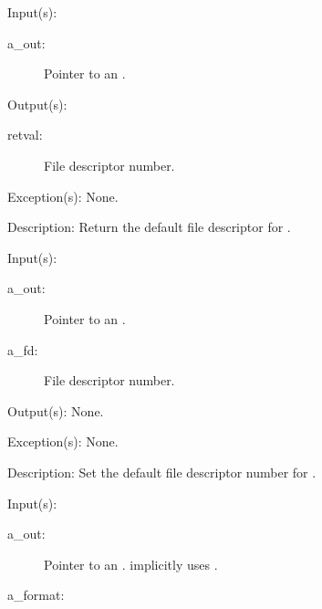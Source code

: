 \begin{capi}
	\begin{capilist}
	\item[Input(s): ]
		\begin{description}\item[]
		\item[a\_out: ]
			Pointer to an .
		\end{description}
	\item[Output(s): ]
		\begin{description}\item[]
		\item[retval: ]
			File descriptor number.
		\end{description}
	\item[Exception(s): ] None.
	\item[Description: ]
		Return the default file descriptor for .
	\end{capilist}
\label{out_default_fd_set}
	\begin{capilist}
	\item[Input(s): ]
		\begin{description}\item[]
		\item[a\_out: ]
			Pointer to an \classname{out}.
		\item[a\_fd: ]
			File descriptor number.
		\end{description}
	\item[Output(s): ] None.
	\item[Exception(s): ] None.
	\item[Description: ]
		Set the default file descriptor number for \cvar{a\_out}.
	\end{capilist}
\label{out_put}
\label{_cw_out_put}
	\begin{capilist}
	\item[Input(s): ]
		\begin{description}\item[]
		\item[a\_out: ]
			Pointer to an .
			 implicitly uses
			\cvar{out\_std}.
		\item[a\_format: ]

\end{description}
\end{capilist}
\end{capi}
